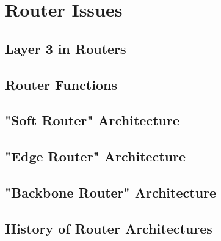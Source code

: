 \section{Router Issues}

\subsection{Layer 3 in Routers}

\subsection{Router Functions}

\subsection{"Soft Router" Architecture}

\subsection{"Edge Router" Architecture}

\subsection{"Backbone Router" Architecture}

\subsection{History of Router Architectures}


